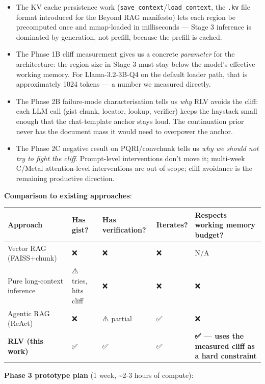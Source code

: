 \documentclass[11pt]{article}
\begin{document}
\begin{itemize}
\item The KV cache persistence work (\texttt{save\_context}/\texttt{load\_context}, the \texttt{.kv} file format introduced for the Beyond RAG manifesto) lets each region be precomputed once and mmap-loaded in milliseconds — Stage 3 inference is dominated by generation, not prefill, because the prefill is cached.
\item The Phase 1B cliff measurement gives us a concrete \textit{parameter} for the architecture: the region size in Stage 3 must stay below the model's effective working memory. For Llama-3.2-3B-Q4 on the default loader path, that is approximately 1024 tokens — a number we measured directly.
\item The Phase 2B failure-mode characterisation tells us \textit{why} RLV avoids the cliff: each LLM call (gist chunk, locator, lookup, verifier) keeps the haystack small enough that the chat-template anchor stays loud. The continuation prior never has the document mass it would need to overpower the anchor.
\item The Phase 2C negative result on PQRI/convchunk tells us \textit{why we should not try to fight the cliff}. Prompt-level interventions don't move it; multi-week C/Metal attention-level interventions are out of scope; cliff avoidance is the remaining productive direction.
\end{itemize}


\textbf{Comparison to existing approaches}:


\begin{center}
\begin{tabular}{lllll}
\toprule
Approach & Has gist? & Has verification? & Iterates? & Respects working memory budget? \\
\midrule
Vector RAG (FAISS+chunk) & ❌ & ❌ & ❌ & N/A \\
Pure long-context inference & ⚠️ tries, hits cliff & ❌ & ❌ & ❌ \\
Agentic RAG (ReAct) & ❌ & ⚠️ partial & ✅ & ❌ \\
\textbf{RLV (this work)} & ✅ & ✅ & ✅ & \textbf{✅ — uses the measured cliff as a hard constraint} \\
\bottomrule
\end{tabular}
\end{center}


\textbf{Phase 3 prototype plan} (1 week, \textasciitilde{}2-3 hours of compute):
\end{document}
